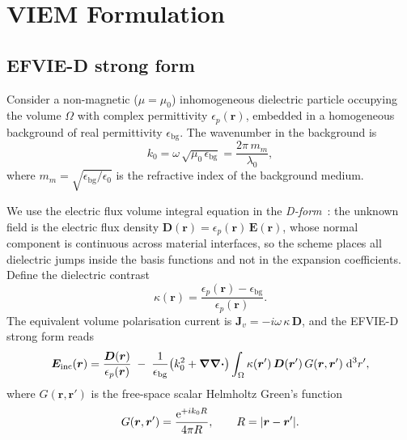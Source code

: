 \documentclass[11pt,a4paper]{article}
\begin{document}
\section{VIEM Formulation}
\label{sec:formulation}

\subsection{EFVIE-D strong form}
\label{sec:efvie-d}

Consider a non-magnetic ($\mu = \mu_0$) inhomogeneous dielectric particle
occupying the volume $\Omega$ with complex permittivity
$\epsilon_p(\bm{r})$, embedded in a homogeneous background of real
permittivity $\epsilon_{\text{bg}}$. The wavenumber in the background is
\begin{equation}
  k_0 = \omega\,\sqrt{\mu_0\,\epsilon_{\text{bg}}}
      = \frac{2\pi\,m_m}{\lambda_0},
  \label{eq:wavenumber}
\end{equation}
where $m_m = \sqrt{\epsilon_{\text{bg}}/\epsilon_0}$ is the refractive
index of the background medium.

We use the electric flux volume integral equation in the
\emph{D-form}~\cite{SWG1984}: the unknown field is the electric flux
density $\bm{D}(\bm{r}) = \epsilon_p(\bm{r})\,\bm{E}(\bm{r})$, whose
normal component is continuous across material interfaces, so the
scheme places all dielectric jumps inside the basis functions and not
in the expansion coefficients. Define the dielectric contrast
\begin{equation}
  \kappa(\bm{r})
    = \frac{\epsilon_p(\bm{r}) - \epsilon_{\text{bg}}}{\epsilon_p(\bm{r})}.
  \label{eq:kappa}
\end{equation}
The equivalent volume polarisation current is
$\bm{J}_v = -i\omega\,\kappa\,\bm{D}$, and the EFVIE-D strong form
reads~\cite{SWG1984,VolakisSertel}
\begin{equation}
  \bm{E}_{\text{inc}}(\bm{r})
    = \frac{\bm{D}(\bm{r})}{\epsilon_p(\bm{r})}
      \;-\;
      \frac{1}{\epsilon_{\text{bg}}}
      \bigl(k_0^{2} + \grad\div\bigr)
      \int_{\Omega} \kappa(\bm{r}')\,\bm{D}(\bm{r}')\,
                    G(\bm{r},\bm{r}')\;\dd^{3}r',
  \label{eq:efvie-strong}
\end{equation}
where $G(\bm{r},\bm{r}')$ is the free-space scalar Helmholtz Green's
function
\begin{equation}
  G(\bm{r},\bm{r}')
    = \frac{\mathrm{e}^{+i k_0 R}}{4\pi R},
  \qquad R = \abs{\bm{r}-\bm{r}'}.
  \label{eq:green-scalar}
\end{equation}
\end{document}
